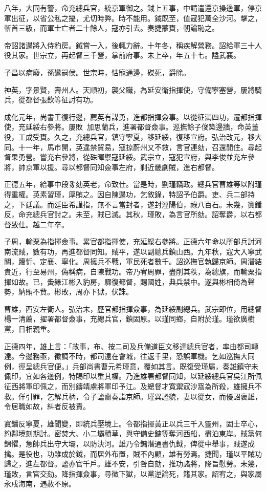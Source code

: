 \begin{pinyinscope}
八年，大同有警，命充總兵官，統京軍御之。鉞上五事，中請遣還京操邊軍，停京軍出征，以省公私之擾，尤切時弊。時不能用。鉞既至，值寇犯萬全沙河。擊之，斬首三級，而軍士亡者二十餘人，寇亦引去。奏捷蒙賚，朝論恥之。

帝詔諸邊將入侍豹房。鉞嘗一入，後輒力辭。十年冬，稱疾解營務。詔給軍三十人役其家。世宗立，再起督三千營，掌前府事。未上卒，年五十七。謚武襄。

子昌以病廢，孫鸞嗣侯。世宗時，怙寵通邊，磔死，爵除。

神英，字景賢，壽州人。天順初，襲父職，為延安衛指揮使，守備寧塞營，屢將騎兵，從都督張欽等征討有功。

成化元年，尚書王復行邊，薦英有謀勇，進都指揮僉事。以從征滿四功，遷都指揮使，充延綏右參將。屢敗加思蘭兵，進署都督僉事。巡撫餘子俊築邊牆，命英董役，工成受賚。久之，充總兵官，鎮守寧夏，移延綏，復移宣府。弘治改元，移大同。十一年，馬市開，英違禁貿易，寇掠蔚州又不救，言官連劾，召還閒住。尋起督果勇營。嘗充右參將，從硃暉禦寇延綏。武宗立，寇犯宣府，與李俊並充左參將，帥京軍以援。尋以都督同知僉事左府，剿近畿劇賊，進右都督。

正德五年，給事中段豸劾英老，命致仕。當是時，劉瑾竊政。總兵官曹雄等以附瑾得重權。英素習瑾，厚賄之。因自陳邊功，乞敘錄，特詔予伯爵。吏、兵二部持之，下廷議。而廷臣希謹指，無不言當封者，遂封涇陽伯，祿八百石。未幾，寘鐇反，命充總兵官討之。未至，賊已滅。其秋，瑾敗，為言官所劾。詔奪爵，以右都督致仕。越二年卒。

子周，輸粟為指揮僉事。累官都指揮使，充延綏右參將。正德六年命以所部兵討河南流賊，數有功，再進都督同知。賊平，遂以副總兵鎮山西。九年秋，寇大入寧武關，躪忻、定襄、寧化。周擁兵不戰，軍民死者數千。詔巡撫官執歸京師。周潛結貴近，行至易州，偽稱病，自陳戰功。帝乃宥周罪，盡削其秩，為總旗，而輸粟指揮如故。已，夤緣江彬入豹房，驟復都督，賜國姓，典兵禁中。遂與彬相倚為聲勢，納賄不貲。彬敗，周亦下獄，伏誅。

曹雄，西安左衛人。弘治末，歷官都指揮僉事，為延綏副總兵。武宗即位，用總督楊一清薦，擢署都督僉事，充總兵官，鎮固原。以瑾同鄉，自附於瑾。瑾欲廣樹黨，日相親重。

正德四年，雄上言：「故事，布、按二司及兵備道臣文移達總兵官者，率由都司轉達。今邊務亟，徵調不時，都司遠在會城，往返千里，恐誤軍機。乞如巡撫大同例，徑呈總兵官便。」兵部尚書曹元希瑾意，覆如其言。既復受瑾屬，奏雄鎮守未佩印，宜如各邊例，特賜印以重其權。乃進雄署都督同知，以延綏總兵官吳江所佩征西將軍印佩之，而別鑄靖虜將軍印予江。及總督才寬禦寇沙窩為所殺，雄擁兵不救。佯引罪，乞解兵柄，令子謐齎奏詣京師。瑾異謐貌，妻以從女，而優詔褒雄，令居職如故，糾者反被責。

寘鐇反寧夏，雄聞變，即統兵壓境上。令都指揮黃正以兵三千入靈州，固士卒心，約鄰境刻期討。密焚大、小二壩積草，與守備史鏞等奪河西船，盡泊東岸。賊黨何錦懼，急帥兵出守大壩，以防決河。雄乃令鏞潛通書仇鉞，俾從中舉事，賊遂成擒。是役也，功雖成於鉞，而居外布置，賊不內顧，雄有勞焉。捷聞，瑾以平賊功歸之，進左都督。謐亦官千戶。雄不安，引咎自劾，推功諸將，降旨慰勞。未幾，瑾敗，言官交劾。降指揮僉事，尋徵下獄，以黨逆論死，籍其家。詔宥之，與家屬永戍海南，遇赦不原。


\end{pinyinscope}
